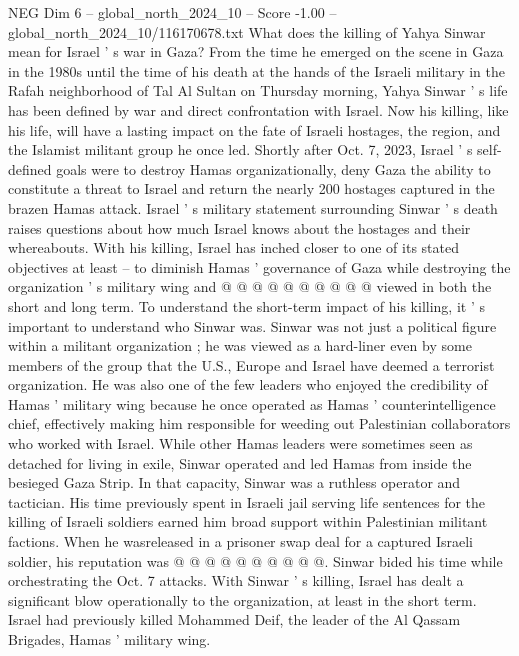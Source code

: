 \begin{textsample}{NEG Dim 6 – global\_north\_2024\_10 – Score -1.00 – global\_north\_2024\_10/116170678.txt}  \label{ex:f6_neg_055}
What does the killing of Yahya Sinwar mean for Israel ' s war in Gaza?
From the time he emerged on the scene in Gaza in the 1980s until the time of his death at the hands of the Israeli military in the Rafah neighborhood of Tal Al Sultan on Thursday morning, Yahya Sinwar ' s life has been defined by war and direct confrontation with Israel.
Now his killing, like his life, will have a lasting impact on the fate of Israeli hostages, the region, and the Islamist militant group he once led.
Shortly after Oct. 7, 2023, Israel ' s self-defined goals were to destroy Hamas organizationally, deny Gaza the ability to constitute a threat to Israel and return the nearly 200 hostages captured in the brazen Hamas attack.
Israel ' s military statement surrounding Sinwar ' s death raises questions about how much Israel knows about the hostages and their whereabouts.
With his killing, Israel has inched closer to one of its stated objectives at least -- to diminish Hamas ' governance of Gaza while destroying the organization ' s military wing and @ @ @ @ @ @ @ @ @ @ viewed in both the short and long term.
To understand the short-term impact of his killing, it ' s important to understand who Sinwar was.
Sinwar was not just a political figure within a militant organization ; he was viewed as a hard-liner even by some members of the group that the U.S., Europe and Israel have deemed a terrorist organization.
He was also one of the few leaders who enjoyed the credibility of Hamas ' military wing because he once operated as Hamas ' counterintelligence chief, effectively making him responsible for weeding out Palestinian collaborators who worked with Israel.
While other Hamas leaders were sometimes seen as detached for living in exile, Sinwar operated and led Hamas from inside the besieged Gaza Strip.
In that capacity, Sinwar was a ruthless operator and tactician.
His time previously spent in Israeli jail serving life sentences for the killing of Israeli soldiers earned him broad support within Palestinian militant factions.
When he wasreleased in a prisoner swap deal for a captured Israeli soldier, his reputation was @ @ @ @ @ @ @ @ @ @.
Sinwar bided his time while orchestrating the Oct. 7 attacks.
With Sinwar ' s killing, Israel has dealt a significant blow operationally to the organization, at least in the short term.
Israel had previously killed Mohammed Deif, the leader of the Al Qassam Brigades, Hamas ' military wing.

\end{textsample}
